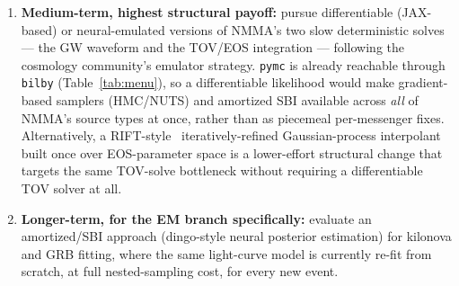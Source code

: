 \documentclass[11pt]{article}
\newcommand{\code}[1]{\texttt{#1}}
\begin{document}
\begin{enumerate}[leftmargin=1.4em]
learned-harmonic-mean pipeline, already validated for pure GW parameter estimation and
evidence computation by the group itself~\cite{Polanska:2024zpn,Wong:2023lgb}, to NMMA's
joint GW+EM+EOS likelihood. The verified $5.4\times$--$14.8\times$ (evidence, single-GW,
growing with dimension) and $\sim$40$\times$--400$\times$ (full PE, GW150914/GW170817)
speedups, on problems of comparable or lower dimensionality than NMMA's joint parametrization,
suggest large, quantifiable gains rather than aspirational ones.
\item \textbf{Medium-term, highest structural payoff:} pursue differentiable (JAX-based) or
neural-emulated versions of NMMA's two slow deterministic solves --- the GW waveform and the
TOV/EOS integration --- following the cosmology community's emulator strategy. \code{pymc} is
already reachable through \code{bilby} (Table~\ref{tab:menu}), so a differentiable likelihood
would make gradient-based samplers (HMC/NUTS) and amortized SBI available across \emph{all}
of NMMA's source types at once, rather than as piecemeal per-messenger fixes. Alternatively,
a RIFT-style~\cite{Lange:2018pyp} iteratively-refined Gaussian-process interpolant built once
over EOS-parameter space is a lower-effort structural change that targets the same TOV-solve
bottleneck without requiring a differentiable TOV solver at all.
\item \textbf{Longer-term, for the EM branch specifically:} evaluate an amortized/SBI
approach (dingo-style neural posterior estimation) for kilonova and GRB fitting, where the
same light-curve model is currently re-fit from scratch, at full nested-sampling cost, for
every new event.
\end{enumerate}
\end{document}
